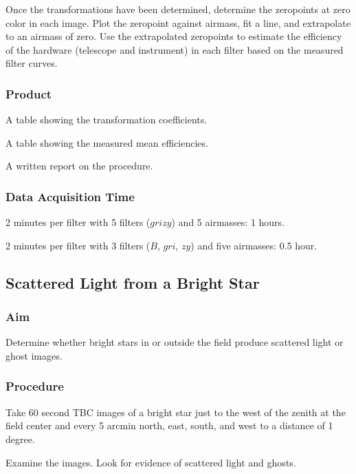 \documentclass{article}
\begin{document}
Once the transformations have been determined, determine the zeropoints at zero color in each image. Plot the zeropoint against airmass, fit a line, and extrapolate to an airmass of zero. Use the extrapolated zeropoints to estimate the efficiency of the hardware (telescope and instrument) in each filter based on the measured filter curves.

\subsubsection{Product}

A table showing the transformation coefficients.

A table showing the measured mean efficiencies.

A written report on the procedure.

\subsubsection{Data Acquisition Time}

2 minutes per filter with 5 filters ($grizy$) and 5 airmasses: 1 hours.

2 minutes per filter with 3 filters ($B$, $gri$, $zy$) and five airmasses: 0.5 hour.


\subsection{Scattered Light from a Bright Star}

\subsubsection{Aim}

Determine whether bright stars in or outside the field produce scattered light or ghost images.

\subsubsection{Procedure}

Take 60 second TBC images of a bright star just to the west of the zenith at the field center and every 5 arcmin north, east, south, and west to a distance of 1 degree.

Examine the images. Look for evidence of scattered light and ghosts.
\end{document}
